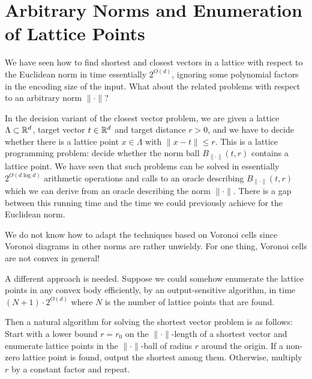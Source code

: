 %
%
%

\chapter{Arbitrary Norms and Enumeration of Lattice Points}

We have seen how to find shortest and closest vectors in a lattice
with respect to the Euclidean norm in time essentially $2^{O(d)}$,
ignoring some polynomial factors in the encoding size of the input.
What about the related problems with respect to an arbitrary norm $\|\cdot\|$?

In the decision variant of the closest vector problem,
we are given a lattice $\Lambda \subset \mathbb{R}^d$,
target vector $t \in \mathbb{R}^d$
and target distance $r > 0$,
and we have to decide whether there is a lattice point $x \in \Lambda$
with $\|x - t\| \leq r$.
This is a lattice programming problem:
decide whether the norm ball $B_{\|\cdot\|}(t,r)$ contains a lattice point.
We have seen that such problems can be solved in essentially
$2^{O(d \log d)}$ arithmetic operations
and calls to an oracle describing $B_{\|\cdot\|}(t,r)$
which we can derive from an oracle describing the norm $\|\cdot\|$.
There is a gap between this running time and
the time we could previously achieve for the Euclidean norm.

We do not know how to adapt the techniques based on Voronoi cells
since Voronoi diagrams in other norms are rather unwieldy.
For one thing, Voronoi cells are not convex in general!

A different approach is needed.
Suppose we could somehow enumerate the lattice points in any convex body efficiently,
by an output-sensitive algorithm,
in time $(N+1)\cdot 2^{O(d)}$
where $N$ is the number of lattice points that are found.

Then a natural algorithm for solving the shortest vector problem is as follows:
Start with a lower bound $r = r_0$ on the $\|\cdot\|$-length of a shortest vector
and enumerate lattice points in the $\|\cdot\|$-ball of radius $r$ around the origin.
If a non-zero lattice point is found, output the shortest among them.
Otherwise, multiply $r$ by a constant factor and repeat.


